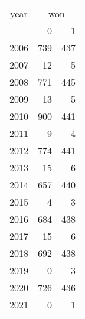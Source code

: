 \footnotesize\begin{tabular}[t]{lrr}
\toprule
\multicolumn{1}{c}{year} & \multicolumn{2}{c}{won} \\
\cmidrule(l{3pt}r{3pt}){1-1} \cmidrule(l{3pt}r{3pt}){2-3}
  & 0 & 1\\
\midrule
2006 & 739 & 437\\
2007 & 12 & 5\\
2008 & 771 & 445\\
2009 & 13 & 5\\
2010 & 900 & 441\\
2011 & 9 & 4\\
2012 & 774 & 441\\
2013 & 15 & 6\\
2014 & 657 & 440\\
2015 & 4 & 3\\
2016 & 684 & 438\\
2017 & 15 & 6\\
2018 & 692 & 438\\
2019 & 0 & 3\\
2020 & 726 & 436\\
2021 & 0 & 1\\
\bottomrule
\end{tabular}
